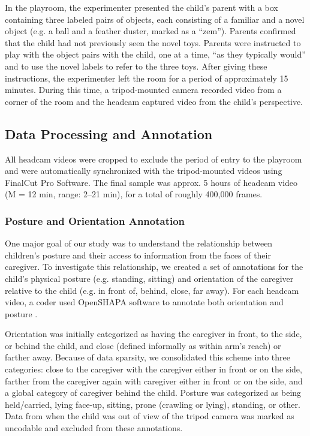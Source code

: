 \documentclass[man,noapacite]{apa2}
\begin{document}
In the playroom, the experimenter presented the child's parent with a box containing three labeled pairs of objects, each consisting of a familiar and a novel object (e.g. a ball and a feather duster, marked as a ``zem''). Parents confirmed that the child had not previously seen the novel toys. Parents were instructed to play with the object pairs with the child, one at a time, ``as they typically would'' and to use the novel labels to refer to the three toys. After giving these instructions, the experimenter left the room for a period of approximately 15 minutes. During this time, a tripod-mounted camera recorded video from a corner of the room and the headcam captured video from the child's perspective. 

\subsection{Data Processing and Annotation}


All headcam videos were cropped to exclude the period of entry to the playroom and were automatically synchronized with the tripod-mounted videos using FinalCut Pro Software. The final sample was approx. 5 hours of headcam video (M = 12 min, range: 2--21 min), for a total of roughly 400,000 frames. 

\subsubsection{Posture and Orientation Annotation}

One major goal of our study was to understand the relationship between children's posture and their access to information from the faces of their caregiver. To investigate this relationship, we created a set of annotations for the child's physical posture (e.g. standing, sitting) and orientation of the caregiver relative to the child (e.g. in front of, behind, close, far away). For each headcam video, a coder used OpenSHAPA software to annotate both orientation and posture \cite{adolph2012}. 

Orientation was initially categorized as having the caregiver in front, to the side, or behind the child, and close (defined informally as within arm's reach) or farther away. Because of data sparsity, we consolidated this scheme into three categories: close to the caregiver with the caregiver either in front or on the side, farther from the caregiver again with caregiver either in front or on the side, and a global category of caregiver behind the child. Posture was categorized as being held/carried, lying face-up, sitting, prone (crawling or lying), standing, or other. Data from when the child was out of view of the tripod camera was marked as uncodable and excluded from these annotations. 
\end{document}
